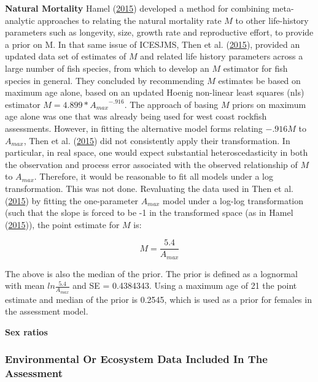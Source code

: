 \documentclass[12pt,]{article}
\begin{document}
\textbf{Natural Mortality} Hamel
(\protect\hyperlink{ref-Hamel2015}{2015}) developed a method for
combining meta-analytic approaches to relating the natural mortality
rate \(M\) to other life-history parameters such as longevity, size,
growth rate and reproductive effort, to provide a prior on M. In that
same issue of ICESJMS, Then et al.
(\protect\hyperlink{ref-Then2015}{2015}), provided an updated data set
of estimates of \(M\) and related life history parameters across a large
number of fish species, from which to develop an \(M\) estimator for
fish species in general. They concluded by recommending \(M\) estimates
be based on maximum age alone, based on an updated Hoenig non-linear
least squares (nls) estimator \(M= 4.899*{A_{max}}^{-.916}\). The
approach of basing \(M\) priors on maximum age alone was one that was
already being used for west coast rockfish assessments. However, in
fitting the alternative model forms relating \(-.916M\) to \(A_{max}\),
Then et al. (\protect\hyperlink{ref-Then2015}{2015}) did not
consistently apply their transformation. In particular, in real space,
one would expect substantial heteroscedasticity in both the observation
and process error associated with the observed relationship of \(M\) to
\(A_{max}\). Therefore, it would be reasonable to fit all models under a
log transformation. This was not done. Revaluating the data used in Then
et al. (\protect\hyperlink{ref-Then2015}{2015}) by fitting the
one-parameter \(A_{max}\) model under a log-log transformation (such
that the slope is forced to be -1 in the transformed space (as in Hamel
(\protect\hyperlink{ref-Hamel2015}{2015})), the point estimate for \(M\)
is:

\begin{equation}
M = \frac{5.4}{A_{max}}
\end{equation}

The above is also the median of the prior. The prior is defined as a
lognormal with mean \(ln\frac{5.4}{A_{max}}\) and SE = 0.4384343. Using
a maximum age of 21 the point estimate and median of the prior is
0.2545, which is used as a prior for females in the assessment model.

\vspace{.5cm}

\textbf{Sex ratios}

\subsubsection{Environmental Or Ecosystem Data Included In The
Assessment}\label{environmental-or-ecosystem-data-included-in-the-assessment}
\end{document}
